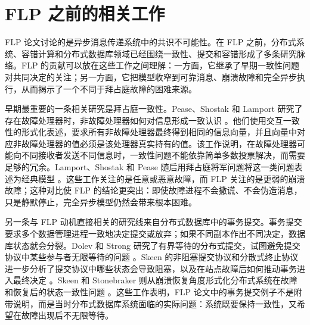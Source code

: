 \section{FLP 之前的相关工作}

FLP 论文讨论的是异步消息传递系统中的共识不可能性。在 FLP 之前，分布式系统、容错计算和分布式数据库领域已经围绕一致性、提交和容错形成了多条研究脉络。FLP 的贡献可以放在这些工作之间理解：一方面，它继承了早期一致性问题对共同决定的关注；另一方面，它把模型收窄到可靠消息、崩溃故障和完全异步执行，从而揭示了一个不同于拜占庭故障的困难来源。

早期最重要的一条相关研究是拜占庭一致性。Pease、Shostak 和 Lamport 研究了存在故障处理器时，非故障处理器如何对信息形成一致认识 \cite{pease1980reaching}。他们使用交互一致性的形式化表述，要求所有非故障处理器最终得到相同的信息向量，并且向量中对应非故障处理器的值必须是该处理器真实持有的值。该工作说明，在故障处理器可能向不同接收者发送不同信息时，一致性问题不能依靠简单多数投票解决，而需要足够的冗余。Lamport、Shostak 和 Pease 随后用拜占庭将军问题将这一类问题表述为经典模型 \cite{lamport1982byzantine}。这些工作关注的是任意或恶意故障，而 FLP 关注的是更弱的崩溃故障；这种对比使 FLP 的结论更突出：即使故障进程不会撒谎、不会伪造消息，只是静默停止，完全异步模型仍然会带来根本困难。

另一条与 FLP 动机直接相关的研究线来自分布式数据库中的事务提交。事务提交要求多个数据管理进程一致地决定提交或放弃；如果不同副本作出不同决定，数据库状态就会分裂。Dolev 和 Strong 研究了有界等待的分布式提交，试图避免提交协议中某些参与者无限等待的问题 \cite{dolev1982distributed}。Skeen 的非阻塞提交协议和分散式终止协议进一步分析了提交协议中哪些状态会导致阻塞，以及在站点故障后如何推动事务进入最终决定 \cite{skeen1981nonblocking,skeen1982decentralized}。Skeen 和 Stonebraker 则从崩溃恢复角度形式化分布式系统在故障和恢复后的状态一致性问题 \cite{skeen1983formal}。这些工作表明，FLP 论文中的事务提交例子不是附带说明，而是当时分布式数据库系统面临的实际问题：系统既要保持一致性，又希望在故障出现后不无限等待。
